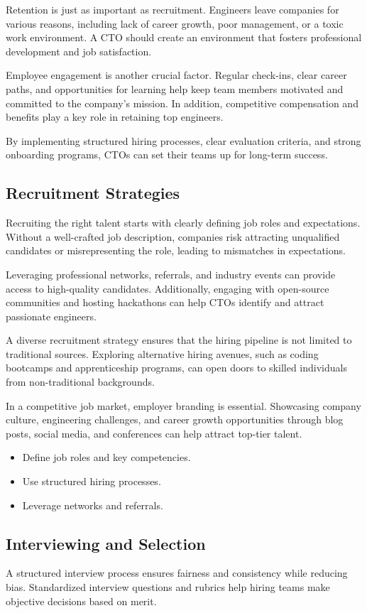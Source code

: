 Retention is just as important as recruitment. Engineers leave companies for various reasons, including lack of career growth, poor management, or a toxic work environment. A CTO should create an environment that fosters professional development and job satisfaction.

Employee engagement is another crucial factor. Regular check-ins, clear career paths, and opportunities for learning help keep team members motivated and committed to the company's mission. In addition, competitive compensation and benefits play a key role in retaining top engineers.

By implementing structured hiring processes, clear evaluation criteria, and strong onboarding programs, CTOs can set their teams up for long-term success.

\subsection{Recruitment Strategies}
Recruiting the right talent starts with clearly defining job roles and expectations. Without a well-crafted job description, companies risk attracting unqualified candidates or misrepresenting the role, leading to mismatches in expectations.

Leveraging professional networks, referrals, and industry events can provide access to high-quality candidates. Additionally, engaging with open-source communities and hosting hackathons can help CTOs identify and attract passionate engineers.

A diverse recruitment strategy ensures that the hiring pipeline is not limited to traditional sources. Exploring alternative hiring avenues, such as coding bootcamps and apprenticeship programs, can open doors to skilled individuals from non-traditional backgrounds.

In a competitive job market, employer branding is essential. Showcasing company culture, engineering challenges, and career growth opportunities through blog posts, social media, and conferences can help attract top-tier talent.

\begin{itemize}
    \item Define job roles and key competencies.
    \item Use structured hiring processes.
    \item Leverage networks and referrals.
\end{itemize}

\subsection{Interviewing and Selection}
A structured interview process ensures fairness and consistency while reducing bias. Standardized interview questions and rubrics help hiring teams make objective decisions based on merit.

